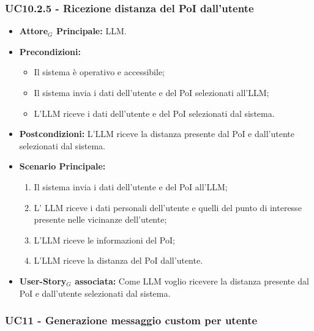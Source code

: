 \documentclass[11pt]{article}
\begin{document}
\begin{justify}
\subsubsection{\textbf{UC10.2.5 - Ricezione distanza del PoI dall'utente}}
\begin{itemize}
    \item \textbf{Attore$_G$ Principale:} LLM.
    \item \textbf{Precondizioni:} 
        \begin{itemize}
          \item Il sistema è operativo e accessibile;
          \item Il sistema invia i dati dell'utente e del PoI selezionati all'LLM;
            \item L'LLM riceve i dati dell'utente e del PoI selezionati dal sistema.
        \end{itemize}
      \item \textbf{Postcondizioni:} L'LLM riceve la distanza presente dal PoI e dall'utente selezionati dal sistema.
    \item \textbf{Scenario Principale:} 
        \begin{enumerate}
          \item Il sistema invia i dati dell'utente e del PoI all'LLM;
        \item L' LLM riceve i dati personali dell'utente e quelli del punto di interesse presente nelle vicinanze dell'utente;
          \item L'LLM riceve le informazioni del PoI;
          \item L'LLM riceve la distanza del PoI dall'utente.
        \end{enumerate}
      \item \textbf{User-Story$_G$ associata:} Come LLM voglio ricevere la distanza presente dal PoI e dall'utente selezionati dal sistema.
\end{itemize}


\subsubsection{\textbf{UC11 - Generazione messaggio custom per utente}}


\end{justify}
\end{document}
